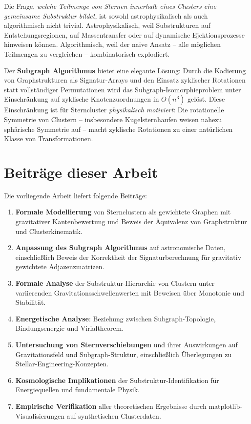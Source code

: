 ﻿\documentclass[a4paper,12pt]{report}
\theoremstyle{definition}
\begin{document}
Die Frage, \emph{welche Teilmenge von Sternen innerhalb eines Clusters eine gemeinsame Substruktur bildet}, ist sowohl astrophysikalisch als auch algorithmisch nicht trivial. Astrophysikalisch, weil Substrukturen auf Entstehungsregionen, auf Massentransfer oder auf dynamische Ejektionsprozesse hinweisen können. Algorithmisch, weil der naive Ansatz -- alle möglichen Teilmengen zu vergleichen -- kombinatorisch explodiert.

Der \textbf{Subgraph Algorithmus} \cite{epp2026} bietet eine elegante Lösung: Durch die Kodierung von Graphstrukturen als Signatur-Arrays und den Einsatz zyklischer Rotationen statt vollständiger Permutationen wird das Subgraph-Isomorphieproblem unter Einschränkung auf zyklische Knotenzuordnungen in $O(n^3)$ gelöst. Diese Einschränkung ist für Sterncluster \emph{physikalisch motiviert}: Die rotationelle Symmetrie von Clustern -- insbesondere Kugelsternhaufen weisen nahezu sphärische Symmetrie auf -- macht zyklische Rotationen zu einer natürlichen Klasse von Transformationen.

\section{Beiträge dieser Arbeit}

Die vorliegende Arbeit liefert folgende Beiträge:

\begin{enumerate}
    \item \textbf{Formale Modellierung} von Sternclustern als gewichtete Graphen mit gravitativer Kantenbewertung und Beweis der Äquivalenz von Graphstruktur und Clusterkinematik.
    \item \textbf{Anpassung des Subgraph Algorithmus} auf astronomische Daten, einschließlich Beweis der Korrektheit der Signaturberechnung für gravitativ gewichtete Adjazenzmatrizen.
    \item \textbf{Formale Analyse} der Substruktur-Hierarchie von Clustern unter variierenden Gravitationsschwellenwerten mit Beweisen über Monotonie und Stabilität.
    \item \textbf{Energetische Analyse}: Beziehung zwischen Subgraph-Topologie, Bindungsenergie und Virialtheorem.
    \item \textbf{Untersuchung von Sternverschiebungen} und ihrer Auswirkungen auf Gravitationsfeld und Subgraph-Struktur, einschließlich Überlegungen zu Stellar-Engineering-Konzepten.
    \item \textbf{Kosmologische Implikationen} der Substruktur-Identifikation für Energiequellen und fundamentale Physik.
    \item \textbf{Empirische Verifikation} aller theoretischen Ergebnisse durch matplotlib-Visuali\-sierungen auf synthetischen Clusterdaten.
\end{enumerate}
\end{document}
